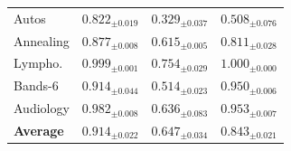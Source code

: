 \begin{table}[t]
\begin{tabular}{lccc}
Autos         & $\mathbf{0.822}_{\pm0.019}$ & $0.329_{\pm0.037}$ & $0.508_{\pm0.076}$ \\
Annealing     & $\mathbf{0.877}_{\pm0.008}$ & $0.615_{\pm0.005}$ & $0.811_{\pm0.028}$ \\
Lympho.       & $0.999_{\pm0.001}$ & $0.754_{\pm0.029}$ & $\mathbf{1.000}_{\pm0.000}$ \\
Bands-6       & $0.914_{\pm0.044}$ & $0.514_{\pm0.023}$ & $\mathbf{0.950}_{\pm0.006}$ \\
Audiology     & $\mathbf{0.982}_{\pm0.008}$ & $0.636_{\pm0.083}$ & $0.953_{\pm0.007}$ \\
\midrule
\textbf{Average} & $\mathbf{0.914}_{\pm0.022}$ & $0.647_{\pm0.034}$ & $0.843_{\pm0.021}$ \\
\bottomrule
\end{tabular}
\end{table}
